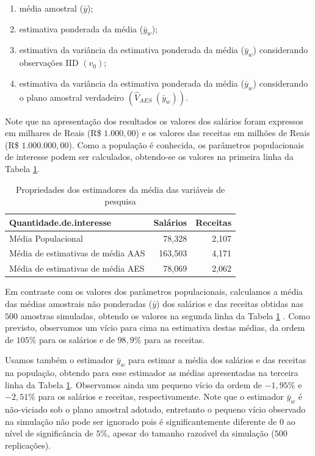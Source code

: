 \documentclass[]{book}
\theoremstyle{definition}
\theoremstyle{definition}
\theoremstyle{definition}
\theoremstyle{remark}
\begin{document}
\begin{enumerate}
\def\labelenumi{\arabic{enumi}.}
\item
  média amostral (\(\bar{y}\));
\item
  estimativa ponderada da média (\(\bar{y}_{w}\));
\item
  estimativa da variância da estimativa ponderada da média
  (\(\bar{y}_{w}\)) considerando observações IID
  \(\left( v_{0}\right)\);
\item
  estimativa da variância da estimativa ponderada da média
  (\(\bar{y}_{w}\)) considerando o plano amostral verdadeiro
  \(\left( \hat{V}_{AES}\ \left( \bar{y}_{w}\right) \right)\).
\end{enumerate}

Note que na apresentação dos resultados os valores dos salários foram
expressos em milhares de Reais (R\$ \(1.000,00\)) e os valores das
receitas em milhões de Reais (R\$ \(1.000.000,00\)). Como a população é
conhecida, os parâmetros populacionais de interesse podem ser
calculados, obtendo-se os valores na primeira linha da Tabela
\ref{tab:proestmed}.

\begin{table}

\caption{\label{tab:proestmed}Propriedades dos estimadores da média das variáveis de pesquisa}
\centering
\begin{tabular}[t]{lrr}
\toprule
Quantidade.de.interesse & Salários & Receitas\\
\midrule
Média Populacional & 78,328 & 2,107\\
Média de estimativas de média AAS & 163,503 & 4,171\\
Média de estimativas de média AES & 78,069 & 2,062\\
\bottomrule
\end{tabular}
\end{table}

Em contraste com os valores dos parâmetros populacionais, calculamos a
média das médias amostrais não ponderadas (\(\bar{y}\)) dos salários e
das receitas obtidas nas \(500\) amostras simuladas, obtendo os valores
na segunda linha da Tabela \ref{tab:proestmed} . Como previsto,
observamos um vício para cima na estimativa destas médias, da ordem de
\(105\%\) para os salários e de \(98,9\%\) para as receitas.

Usamos também o estimador \(\bar{y}_{w}\) para estimar a média dos
salários e das receitas na população, obtendo para esse estimador as
médias apresentadas na terceira linha da Tabela \ref{tab:proestmed}.
Observamos ainda um pequeno vício da ordem de \(-1,95\%\) e \(-2,51\%\)
para os salários e receitas, respectivamente. Note que o estimador
\(\bar{y}_{w}\) é não-viciado sob o plano amostral adotado, entretanto o
pequeno vício observado na simulação não pode ser ignorado pois é
significantemente diferente de \(0\) ao nível de significância de
\(5\%\), apesar do tamanho razoável da simulação (\(500\) replicações).
\end{document}
